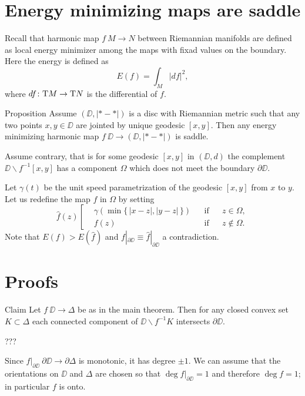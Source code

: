 \documentclass{article}
\begin{document}
\section{Energy minimizing maps are saddle}

Recall that harmonic map $f\:M\to N$ between Riemannian manifolds are defined as local energy minimizer among the maps with fixad values on the boundary.
Here the energy is defined as 
\[E(f)=\int_M|df|^2,\]
where $df\colon\mathrm{T} M\to \mathrm{T} N$ is the differential of $f$.

\begin{thm}{Proposition} 
Assume $(\DD,|{*}-{*}|)$ is a disc with Riemannian metric such that any two points $x,y\in\DD$ are jointed by unique geodesic $[x,y]$.
Then any energy minimizing harmonic map $f\:\DD\to(\DD,|{*}-{*}|)$ is saddle.
\end{thm}

Assume contrary, that is for some geodesic $[x,y]$ in $(\DD,d)$ the complement $\DD\backslash f^{-1}[x,y]$ has a component $\Omega$ which does not meet the boundary $\partial\DD$.

Let $\gamma(t)$ be the unit speed parametrization of the geodesic $[x,y]$ from $x$ to $y$.
Let us redefine the map $f$ in $\Omega$ by setting 
\[\hat f(z)\left[
\begin{aligned}
&\gamma(\min\{\,|x-z|,|y-z|\,\})&&\text{if}&& z\in\Omega,
\\
&f(z)&&\text{if}&& z\notin\Omega.
\end{aligned}
\right.\]
Note that $E(f)>E(\hat f)$ and $f|_{\partial \DD}\equiv \hat f|_{\partial \DD}$ a contradiction.
\qeds


\section{Proofs}

\begin{thm}{Claim}\label{claim}
Let $f\:\DD\to \Delta$ be as in the main theorem.
Then for any closed convex set $K\subset\Delta$ each connected component of $\DD\backslash f^{-1}K$ intersects $\partial\DD$.
\end{thm}

???\qeds

Since $f|_{\partial\DD}\:\partial\DD \to\partial \Delta$ is monotonic, it has degree $\pm1$.
We can assume that the orientations on $\DD$ and $\Delta$ are chosen so that $\deg f|_{\partial\DD}=1$
and therefore $\deg f=1$;
in particular $f$ is onto.
\end{document}
